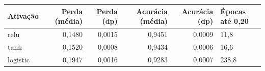 \begin{tabular}{lrrrrl}
\toprule
Ativação & Perda (média) & Perda (dp) & Acurácia (média) & Acurácia (dp) & Épocas até 0,20 \\
\midrule
relu & 0,1480 & 0,0015 & 0,9451 & 0,0009 & 11,8 \\
tanh & 0,1520 & 0,0008 & 0,9434 & 0,0006 & 16,6 \\
logistic & 0,1947 & 0,0016 & 0,9283 & 0,0007 & 238,8 \\
\bottomrule
\end{tabular}
